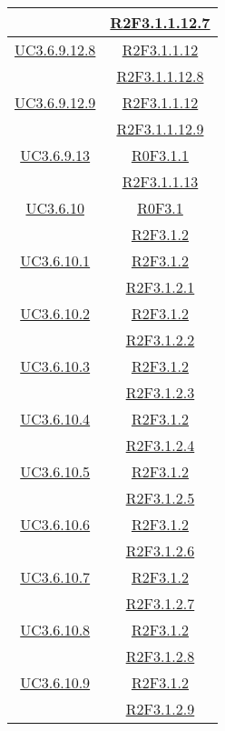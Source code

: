 \begin{longtable}{|c|c|}
& \hyperlink{R2F3.1.1.12.7}{R2F3.1.1.12.7}\\
\hline
\hyperlink{UC3.6.9.12.8}{UC3.6.9.12.8} & \hyperlink{R2F3.1.1.12}{R2F3.1.1.12}\\
& \hyperlink{R2F3.1.1.12.8}{R2F3.1.1.12.8}\\
\hline
\hyperlink{UC3.6.9.12.9}{UC3.6.9.12.9} & \hyperlink{R2F3.1.1.12}{R2F3.1.1.12}\\
& \hyperlink{R2F3.1.1.12.9}{R2F3.1.1.12.9}\\
\hline
\hyperlink{UC3.6.9.13}{UC3.6.9.13} & \hyperlink{R0F3.1.1}{R0F3.1.1}\\
& \hyperlink{R2F3.1.1.13}{R2F3.1.1.13}\\
\hline
\hyperlink{UC3.6.10}{UC3.6.10} & \hyperlink{R0F3.1}{R0F3.1}\\
& \hyperlink{R2F3.1.2}{R2F3.1.2}\\
\hline
\hyperlink{UC3.6.10.1}{UC3.6.10.1} & \hyperlink{R2F3.1.2}{R2F3.1.2}\\
& \hyperlink{R2F3.1.2.1}{R2F3.1.2.1}\\
\hline
\hyperlink{UC3.6.10.2}{UC3.6.10.2} & \hyperlink{R2F3.1.2}{R2F3.1.2}\\
& \hyperlink{R2F3.1.2.2}{R2F3.1.2.2}\\
\hline
\hyperlink{UC3.6.10.3}{UC3.6.10.3} & \hyperlink{R2F3.1.2}{R2F3.1.2}\\
& \hyperlink{R2F3.1.2.3}{R2F3.1.2.3}\\
\hline
\hyperlink{UC3.6.10.4}{UC3.6.10.4} & \hyperlink{R2F3.1.2}{R2F3.1.2}\\
& \hyperlink{R2F3.1.2.4}{R2F3.1.2.4}\\
\hline
\hyperlink{UC3.6.10.5}{UC3.6.10.5} & \hyperlink{R2F3.1.2}{R2F3.1.2}\\
& \hyperlink{R2F3.1.2.5}{R2F3.1.2.5}\\
\hline
\hyperlink{UC3.6.10.6}{UC3.6.10.6} & \hyperlink{R2F3.1.2}{R2F3.1.2}\\
& \hyperlink{R2F3.1.2.6}{R2F3.1.2.6}\\
\hline
\hyperlink{UC3.6.10.7}{UC3.6.10.7} & \hyperlink{R2F3.1.2}{R2F3.1.2}\\
& \hyperlink{R2F3.1.2.7}{R2F3.1.2.7}\\
\hline
\hyperlink{UC3.6.10.8}{UC3.6.10.8} & \hyperlink{R2F3.1.2}{R2F3.1.2}\\
& \hyperlink{R2F3.1.2.8}{R2F3.1.2.8}\\
\hline
\hyperlink{UC3.6.10.9}{UC3.6.10.9} & \hyperlink{R2F3.1.2}{R2F3.1.2}\\
& \hyperlink{R2F3.1.2.9}{R2F3.1.2.9}\\

\end{longtable}
